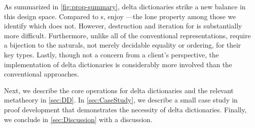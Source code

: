 As summarized in \autoref{fig:prop-summary}, delta dictionaries strike a new balance in this design space.
%
Compared to \cal{}s, \dds{} enjoy \SemTot{}---the lone property among those we identify which \cal{} does not.
%
However, destruction and iteration for \dds{} is substantially more difficult.
%
Furthermore, unlike all of the conventional representations, \dds{} require a bijection to the naturals, not merely decidable equality or ordering, for their key types.
%
%
Lastly, though not a concern from a client's perspective, the implementation of delta dictionaries is considerably more involved than the conventional approaches.





%
%
Next, we describe the core operations for delta dictionaries and the relevant metatheory in \autoref{sec:DD}.
%
In \autoref{sec:CaseStudy}, we describe a small case study in proof development that demonstrates the necessity of delta dictionaries.
%
Finally, we conclude in \autoref{sec:Discussion} with a discussion. %
%



